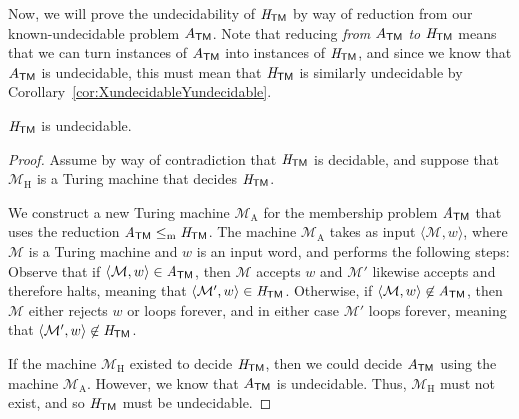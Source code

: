 Now, we will prove the undecidability of $\mathit{H}_{\textsf{TM}}$ by way of reduction from our known-undecidable problem $A_{\textsf{TM}}$. Note that reducing \emph{from} $A_{\textsf{TM}}$ \emph{to} $\mathit{H}_{\textsf{TM}}$ means that we can turn instances of $A_{\textsf{TM}}$ into instances of $\mathit{H}_{\textsf{TM}}$, and since we know that $A_{\textsf{TM}}$ is undecidable, this must mean that $\mathit{H}_{\textsf{TM}}$ is similarly undecidable by Corollary~\ref{cor:XundecidableYundecidable}.

\begin{theorem}\label{thm:HTMundecidable}
$\mathit{H}_{\textsf{TM}}$ is undecidable.

\begin{proof}
Assume by way of contradiction that $\mathit{H}_{\textsf{TM}}$ is decidable, and suppose that $\mathcal{M}_{\mathrm{H}}$ is a Turing machine that decides $\mathit{H}_{\textsf{TM}}$.

We construct a new Turing machine $\mathcal{M}_{\mathrm{A}}$ for the membership problem $\mathit{A}_{\textsf{TM}}$ that uses the reduction $\mathit{A}_{\textsf{TM}} \leq_{\mathrm{m}} \mathit{H}_{\textsf{TM}}$. The machine $\mathcal{M}_{\mathrm{A}}$ takes as input $\langle \mathcal{M}, w \rangle$, where $\mathcal{M}$ is a Turing machine and $w$ is an input word, and performs the following steps:
Observe that if $\langle \mathcal{M}, w \rangle \in \mathit{A}_{\textsf{TM}}$, then $\mathcal{M}$ accepts $w$ and $\mathcal{M}'$ likewise accepts and therefore halts, meaning that $\langle \mathcal{M}', w \rangle \in \mathit{H}_{\textsf{TM}}$. Otherwise, if $\langle \mathcal{M}, w \rangle \not\in \mathit{A}_{\textsf{TM}}$, then $\mathcal{M}$ either rejects $w$ or loops forever, and in either case $\mathcal{M}'$ loops forever, meaning that $\langle \mathcal{M}', w \rangle \not\in \mathit{H}_{\textsf{TM}}$.

If the machine $\mathcal{M}_{\mathrm{H}}$ existed to decide $\mathit{H}_{\textsf{TM}}$, then we could decide $A_{\textsf{TM}}$ using the machine $\mathcal{M}_{\mathrm{A}}$. However, we know that $A_{\textsf{TM}}$ is undecidable. Thus, $\mathcal{M}_{\mathrm{H}}$ must not exist, and so $\mathit{H}_{\textsf{TM}}$ must be undecidable.
\end{proof}
\end{theorem}

